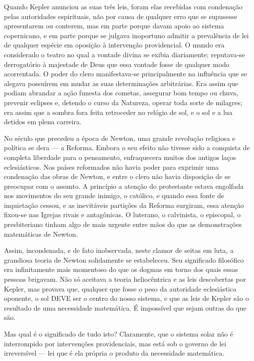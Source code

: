 \documentclass[11pt,a5paper,twoside,openany]{book}
\begin{document}
Quando Kepler anunciou as suas três leis, foram elas recebidas com condenação pelas autoridades espirituais, não por causa de qualquer erro que se supusesse apresentarem ou conterem, mas em parte porque davam apoio ao sistema copernicano, e em parte porque se julgava inoportuno admitir a prevalência de lei de qualquer espécie em oposição à intervenção providencial. O mundo era considerado o teatro no qual a vontade divina se exibia diariamente; reputava-se derrogatório à majestade de Deus que essa vontade fosse de qualquer modo acorrentada. O poder do clero manifestava-se principalmente na influência que se alegava possuírem em mudar as suas determinações arbitrárias. Era assim que podiam abrandar a ação funesta dos cometas, assegurar bom tempo ou chuva, prevenir eclipses e, detendo o curso da Natureza, operar toda sorte de milagres; era assim que a sombra fora feita retroceder no relógio de sol, e o sol e a lua detidos em plena carreira.

No século que precedeu a época de Newton, uma grande revolução religiosa e política se dera — a Reforma. Embora o seu efeito não tivesse sido a conquista de completa liberdade para o pensamento, enfraquecera muitos dos antigos laços eclesiásticos. Nos países reformados não havia poder para exprimir uma condenação das obras de Newton, e entre o clero não havia disposição de se preocupar com o assunto. A princípio a atenção do protestante estava engolfada nos movimentos do seu grande inimigo, o católico, e quando essa fonte de inquietação cessou, e as inevitáveis partições da Reforma surgiram, essa atenção fixou-se nas Igrejas rivais e antagônicas. O luterano, o calvinista, o episcopal, o presbiteriano tinham algo de mais urgente entre mãos do que as demonstrações matemáticas de Newton.

Assim, incondenada, e de fato inobservada, neste clamor de seitas em luta, a grandiosa teoria de Newton solidamente se estabeleceu. Seu significado filosófico era infinitamente mais momentoso do que os dogmas em torno dos quais essas pessoas brigavam. Não só aceitava a teoria heliocêntrica e as leis descobertas por Kepler, mas provava que, qualquer que fosse o peso da autoridade eclesiástica oponente, o sol DEVE ser o centro do nosso sistema, e que as leis de Kepler são o resultado de uma necessidade matemática. É impossível que sejam outras do que são.

Mas qual é o significado de tudo isto? Claramente, que o sistema solar não é interrompido por intervenções providenciais, mas está sob o governo de lei irreversível — lei que é ela própria o produto da necessidade matemática.
\end{document}
